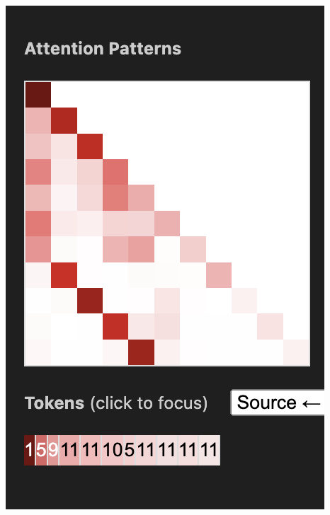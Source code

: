 \documentclass{article}
\begin{document}
\begin{center}
    \includegraphics[scale=0.4]{images/att_encoding2.png}

\end{center}
\end{document}
